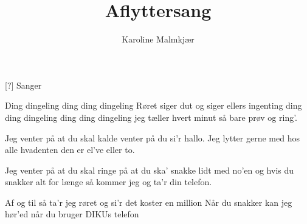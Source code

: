 \documentclass[a4paper,11pt]{article}
\title{Aflyttersang}
\author{Karoline Malmkjær}
\begin{document}
\maketitle

\begin{roles}
[?] Sanger
\end{roles}

\begin{song}
Ding dingeling ding ding dingeling
Røret siger dut og siger ellers ingenting
ding ding dingeling ding ding dingeling
jeg tæller hvert minut så bare prøv og ring'.

Jeg venter på at du skal kalde
venter på du si'r hallo.
Jeg lytter gerne med hos alle
hvadenten den er el've eller to.

Jeg venter på at du skal ringe
på at du ska' snakke lidt med no'en
og hvis du snakker alt for længe
så kommer jeg og ta'r din telefon.

Af og til så ta'r jeg røret 
og si'r det koster en million 
Når du snakker kan jeg hør'ed
når du bruger DIKUs telefon

\end{song}
\end{document}
